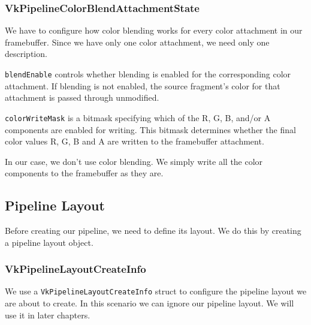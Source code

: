 \subsubsection{VkPipelineColorBlendAttachmentState}

We have to configure how color blending works for every color attachment
in our framebuffer.
Since we have only one color attachment, we need only one description.

\texttt{blendEnable} controls whether blending is enabled for the corresponding
color attachment.
If blending is not enabled, the source fragment's color for that attachment
is passed through unmodified.

\texttt{colorWriteMask} is a bitmask specifying which of the R, G, B, and/or A
components are enabled for writing.
This bitmask determines whether the final color values R, G, B and A are written
to the framebuffer attachment.

In our case, we don't use color blending.
We simply write all the color components to the framebuffer as they are.

\begin{minipage}{\linewidth}{\noindent}
    
\end{minipage}

\subsection{Pipeline Layout}

Before creating our pipeline, we need to define its layout.
We do this by creating a pipeline layout object.

\begin{minipage}{\linewidth}{\noindent}
    
\end{minipage}

\subsubsection{VkPipelineLayoutCreateInfo}

We use a \texttt{VkPipelineLayoutCreateInfo} struct to configure the pipeline
layout we are about to create.
In this scenario we can ignore our pipeline layout.
We will use it in later chapters.

